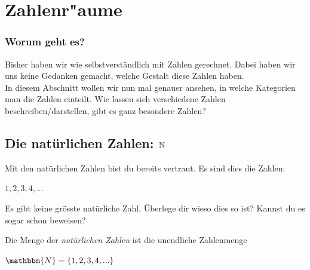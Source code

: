 
\chapter{Zahlenr"aume}

\begin{framed}
\subsection*{Worum geht es?}
Bisher haben wir wie selbstverständlich mit Zahlen gerechnet. Dabei haben wir uns keine Gedanken gemacht, welche Gestalt diese Zahlen haben. \\In diesem Abschnitt wollen wir nun mal genauer ansehen, in welche Kategorien man die Zahlen einteilt.
Wie lassen sich verschiedene Zahlen beschreiben/darstellen, gibt es ganz besondere Zahlen? 
\vspace{1cm}
\end{framed}

\section{Die natürlichen Zahlen: $\mathbb{N}$}
Mit den natürlichen Zahlen bist du bereits vertraut. 
Es sind dies die Zahlen:
\begin{center}
$1,2,3,4,...$
\end{center}
\begin{aufgabe}
Es gibt keine grösste natürliche Zahl. Überlege dir wieso dies so ist? Kannst du es sogar schon beweisen?
\end{aufgabe}


\begin{definition}[$\mathbbm{N}$]
Die Menge der \emph{natürlichen Zahlen} ist die unendliche Zahlenmenge \begin{center}$\mathbbm{N}=\{1,2,3,4,...\}$\end{center}
\end{definition}

